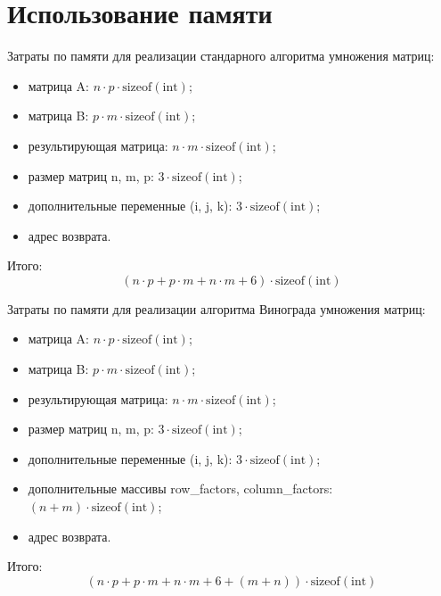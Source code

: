 \section{Использование памяти}

Затраты по памяти для реализации стандарного алгоритма умножения матриц:
\begin{itemize}
	\item матрица A: $n \cdot p \cdot \text{sizeof}(\text{int})$;
	\item матрица B: $p \cdot m \cdot \text{sizeof}(\text{int})$;
	\item результирующая матрица: $n \cdot m \cdot \text{sizeof}(\text{int})$;
	\item размер матриц n, m, p: $3\cdot \text{sizeof}(\text{int})$;
	\item дополнительные переменные (i, j, k): $3\cdot \text{sizeof}(\text{int})$;
	\item адрес возврата.
\end{itemize}

Итого:
\begin{equation}
	\label{eq:stand_alg}
	(n \cdot p + p \cdot m + n \cdot m + 6) \cdot \text{sizeof}(\text{int})
\end{equation}

Затраты по памяти для реализации алгоритма Винограда умножения матриц:
\begin{itemize}
	\item матрица A: $n \cdot p \cdot \text{sizeof}(\text{int})$;
	\item матрица B: $p \cdot m \cdot \text{sizeof}(\text{int})$;
	\item результирующая матрица: $n \cdot m \cdot \text{sizeof}(\text{int})$;
	\item размер матриц n, m, p: $3\cdot \text{sizeof}(\text{int})$;
	\item дополнительные переменные (i, j, k): $3\cdot \text{sizeof}(\text{int})$;
	\item дополнительные массивы row\_factors, column\_factors: $(n + m) \cdot\text{sizeof}(\text{int})$;
	\item адрес возврата.
\end{itemize}

Итого:
\begin{equation}
	\label{eq:wino_alg}
	(n \cdot p + p \cdot m + n \cdot m + 6 + (m + n)) \cdot \text{sizeof}(\text{int})
\end{equation}


